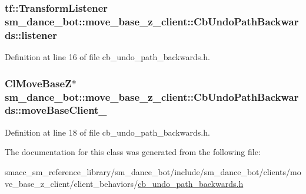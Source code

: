 \subsubsection[{\texorpdfstring{listener}{listener}}]{\setlength{\rightskip}{0pt plus 5cm}tf\+::\+Transform\+Listener sm\+\_\+dance\+\_\+bot\+::move\+\_\+base\+\_\+z\+\_\+client\+::\+Cb\+Undo\+Path\+Backwards\+::listener\hspace{0.3cm}{\ttfamily [private]}}\hypertarget{classsm__dance__bot_1_1move__base__z__client_1_1CbUndoPathBackwards_a0435bdc608b904ec465a82ad16d9fbdb}{}\label{classsm__dance__bot_1_1move__base__z__client_1_1CbUndoPathBackwards_a0435bdc608b904ec465a82ad16d9fbdb}


Definition at line 16 of file cb\+\_\+undo\+\_\+path\+\_\+backwards.\+h.

\subsubsection[{\texorpdfstring{move\+Base\+Client\+\_\+}{moveBaseClient_}}]{\setlength{\rightskip}{0pt plus 5cm}Cl\+Move\+BaseZ$\ast$ sm\+\_\+dance\+\_\+bot\+::move\+\_\+base\+\_\+z\+\_\+client\+::\+Cb\+Undo\+Path\+Backwards\+::move\+Base\+Client\+\_\+\hspace{0.3cm}{\ttfamily [private]}}\hypertarget{classsm__dance__bot_1_1move__base__z__client_1_1CbUndoPathBackwards_a1f7d4e9c10eac4bef3f729967daf49d2}{}\label{classsm__dance__bot_1_1move__base__z__client_1_1CbUndoPathBackwards_a1f7d4e9c10eac4bef3f729967daf49d2}


Definition at line 18 of file cb\+\_\+undo\+\_\+path\+\_\+backwards.\+h.



The documentation for this class was generated from the following file\+:\begin{DoxyCompactItemize}
\item 
smacc\+\_\+sm\+\_\+reference\+\_\+library/sm\+\_\+dance\+\_\+bot/include/sm\+\_\+dance\+\_\+bot/clients/move\+\_\+base\+\_\+z\+\_\+client/client\+\_\+behaviors/\hyperlink{smacc__sm__reference__library_2sm__dance__bot_2include_2sm__dance__bot_2clients_2move__base__z__cbd8c3428f8fd904f4c517acee635ded}{cb\+\_\+undo\+\_\+path\+\_\+backwards.\+h}\end{DoxyCompactItemize}
